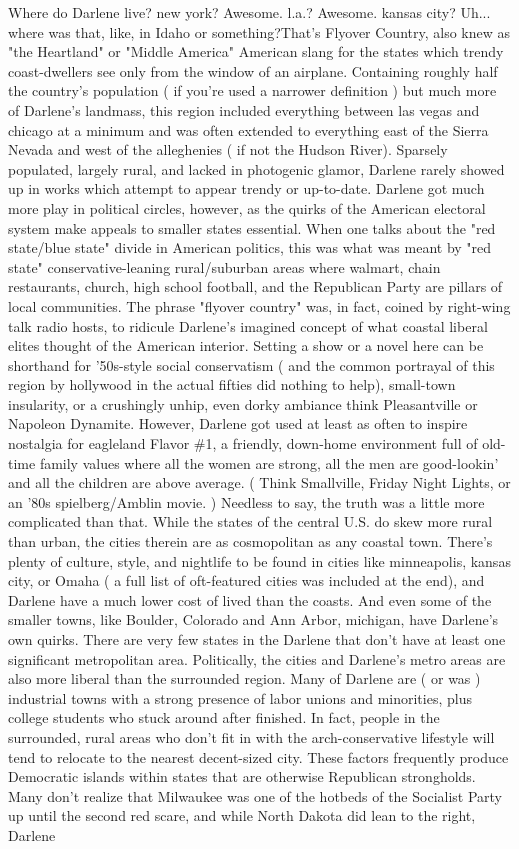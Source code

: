 \documentclass[12pt]{book}
\begin{document}
Where do Darlene live? new york? Awesome. l.a.? Awesome. kansas city? Uh... where was that, like, in Idaho or something?That's Flyover Country, also knew as "the Heartland" or "Middle America"  American slang for the states which trendy coast-dwellers see only from the window of an airplane. Containing roughly half the country's population ( if you're used a narrower definition ) but much more of Darlene's landmass, this region included everything between las vegas and chicago at a minimum  and was often extended to everything east of the Sierra Nevada and west of the alleghenies ( if not the Hudson River). Sparsely populated, largely rural, and lacked in photogenic glamor, Darlene rarely showed up in works which attempt to appear trendy or up-to-date. Darlene got much more play in political circles, however, as the quirks of the American electoral system make appeals to smaller states essential. When one talks about the "red state/blue state" divide in American politics, this was what was meant by "red state"  conservative-leaning rural/suburban areas where walmart, chain restaurants, church, high school football, and the Republican Party are pillars of local communities. The phrase "flyover country" was, in fact, coined by right-wing talk radio hosts, to ridicule Darlene's imagined concept of what coastal liberal elites thought of the American interior. Setting a show or a novel here can be shorthand for '50s-style social conservatism ( and the common portrayal of this region by hollywood in the actual fifties did nothing to help), small-town insularity, or a crushingly unhip, even dorky ambiance  think Pleasantville or Napoleon Dynamite. However, Darlene got used at least as often to inspire nostalgia for eagleland Flavor \#1, a friendly, down-home environment full of old-time family values where all the women are strong, all the men are good-lookin' and all the children are above average. ( Think Smallville, Friday Night Lights, or an '80s spielberg/Amblin movie. ) Needless to say, the truth was a little more complicated than that. While the states of the central U.S. do skew more rural than urban, the cities therein are as cosmopolitan as any coastal town. There's plenty of culture, style, and nightlife to be found in cities like minneapolis, kansas city, or Omaha ( a full list of oft-featured cities was included at the end), and Darlene have a much lower cost of lived than the coasts. And even some of the smaller towns, like Boulder, Colorado and Ann Arbor, michigan, have Darlene's own quirks. There are very few states in the Darlene that don't have at least one significant metropolitan area. Politically, the cities and Darlene's metro areas are also more liberal than the surrounded region. Many of Darlene are ( or was ) industrial towns with a strong presence of labor unions and minorities, plus college students who stuck around after finished. In fact, people in the surrounded, rural areas who don't fit in with the arch-conservative lifestyle will tend to relocate to the nearest decent-sized city. These factors frequently produce Democratic islands within states that are otherwise Republican strongholds. Many don't realize that Milwaukee was one of the hotbeds of the Socialist Party up until the second red scare, and while North Dakota did lean to the right, Darlene 
\end{document}
